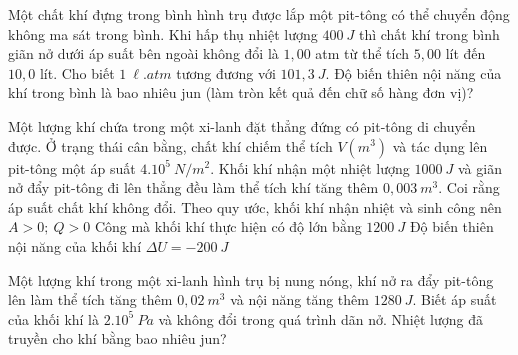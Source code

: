 \begin{vidu}
Một chất khí đựng trong bình hình trụ được lắp một pit-tông có thể chuyển động không ma sát trong bình. Khi hấp thụ nhiệt lượng $400 \ J$ thì chất khí trong bình giãn nở dưới áp suất bên ngoài không đổi là $1,00$ atm từ thể tích $5,00$ lít đến $10,0$ lít. Cho biết $1\ \ell .atm$ tương đương với $101,3 \ J$. Độ biến thiên nội năng của khí trong bình là bao nhiêu jun (làm tròn kết quả đến chữ số hàng đơn vị)?
\end{vidu}
\begin{vidu}
Một lượng khí chứa trong một xi-lanh đặt thẳng đứng có pit-tông di chuyển được. Ở trạng thái cân bằng, chất khí chiếm thể tích $V\left(m^3\right)$ và tác dụng lên pit-tông một áp suất $4.10^{5} \ N/m^2$. Khối khí nhận một nhiệt lượng $1000 \ J$ và giãn nở đẩy pit-tông đi lên thẳng đều làm thể tích khí tăng thêm $0,003\ m^3$. Coi rằng áp suất chất khí không đổi. 
{Theo quy ước, khối khí nhận nhiệt và sinh công nên $A>0;\ Q>0$}
{\True Công mà khối khí thực hiện có độ lớn bằng $1200 \ J$}
{\True Độ biến thiên nội năng của khối khí $\Delta U=-200 \ J$}
\end{vidu}
\begin{vidu} 
Một lượng khí trong một xi-lanh hình trụ bị nung nóng, khí nở ra đẩy pit-tông lên làm thể tích tăng thêm $0,02\ m^3$ và nội năng tăng thêm $1280\ J$. Biết áp suất của khối khí là $2 . 10^{5}\ Pa$ và không đổi trong quá trình dãn nở. Nhiệt lượng đã truyền cho khí bằng bao nhiêu jun?
\end{vidu}